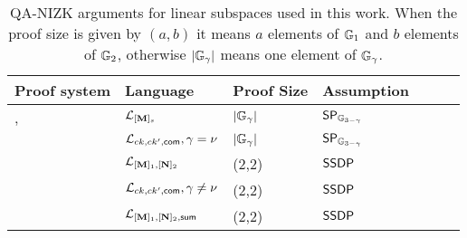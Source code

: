 
\begin{table}[h]
\begin{center}
\begin{minipage}{\textwidth}
\begin{center}
\begin{tabular}{|l|lll|lll|}
\hline
Proof system                                & Language                            & Proof Size & Assumption \\
\hline\hline
\cite{EC:KilWee15}, \cite{C:JutRoy14}  & $\mathcal{L}_{[\mathbf{{M}}]_s}$ & $|\mathbb{G}_{\gamma}|$          & $\mathsf{SP}_{\mathbb{G}_{3-\gamma}}$ \\
  & $\mathcal{L}_{ck,ck',\mathsf{com}}, \gamma =\nu$ & $|\mathbb{G}_{\gamma}|$          & $\mathsf{SP}_{\mathbb{G}_{3-\gamma}}$ \\
\hline
                                            & $\mathcal{L}_{[\mathbf{{M}}]_1,[\mathbf{{N}}]_2}$      & (2,2)      & $\mathsf{SSDP}$ \\
\cite{AC:GonHevRaf15}                       & $\mathcal{L}_{ck,ck',\mathsf{com}}, \gamma \neq \nu$                    & (2,2)      & $\mathsf{SSDP}$ \\
                                            & $\mathcal{L}_{[\mathbf{{M}}]_1,[\mathbf{{N}}]_2,\mathsf{sum}}$ & (2,2)      & $\mathsf{SSDP}$\\
\hline
\end{tabular}
\end{center}
\caption{QA-NIZK arguments for linear subspaces used in this work. When the proof size is given by $(a,b)$ it means $a$ elements of $\mathbb{G}_1$ and $b$ elements of $\mathbb{G}_2$, otherwise $|\mathbb{G}_{\gamma}|$ means one element of $\mathbb{G}_{\gamma}$.  \label{table:lin-sp}} 
\end{minipage}
\vspace{-0.54cm}

\end{center}
\end{table}
